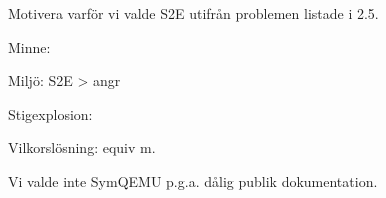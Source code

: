 Motivera varför vi valde S2E utifrån problemen listade i 2.5.

Minne:

Miljö: S2E > angr

Stigexplosion: 

Vilkorslösning: equiv m.

Vi valde inte SymQEMU p.g.a. dålig publik dokumentation.
